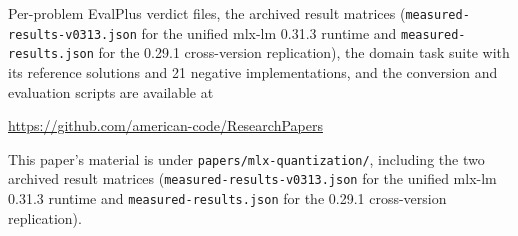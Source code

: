 \documentclass[11pt]{article}
\begin{document}
Per-problem EvalPlus verdict files, the archived result matrices
(\texttt{measured-results-v0313.json} for the unified mlx-lm 0.31.3 runtime and
\texttt{measured-results.json} for the 0.29.1 cross-version replication), the domain task
suite with its reference solutions and 21 negative implementations, and the conversion and
evaluation scripts are available at
\begin{center}
  \url{https://github.com/american-code/ResearchPapers}
\end{center}
This paper's material is under \texttt{papers/mlx-quantization/}, including the two
archived result matrices (\texttt{measured-results-v0313.json} for the unified
mlx-lm 0.31.3 runtime and \texttt{measured-results.json} for the 0.29.1
cross-version replication).
\begin{center}
\end{center}



\end{document}
